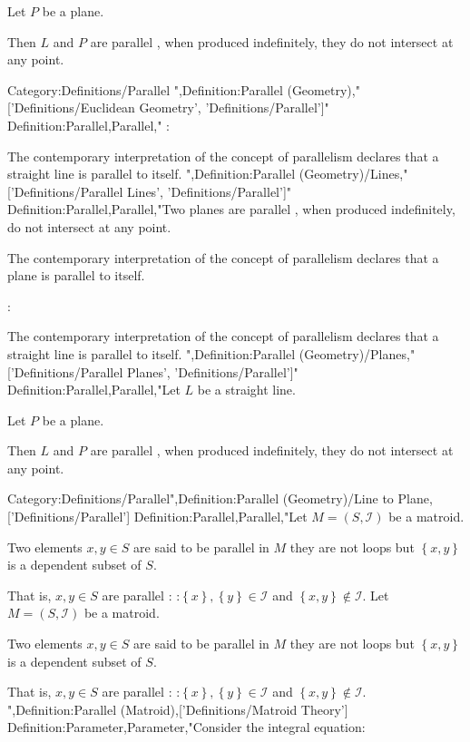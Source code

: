 Let $P$ be a plane.

Then $L$ and $P$ are parallel , when produced indefinitely, they do not intersect at any point.


Category:Definitions/Parallel
",Definition:Parallel (Geometry),"['Definitions/Euclidean Geometry', 'Definitions/Parallel']"
Definition:Parallel,Parallel,"
:


The contemporary interpretation of the concept of parallelism declares that a straight line is parallel to itself.
",Definition:Parallel (Geometry)/Lines,"['Definitions/Parallel Lines', 'Definitions/Parallel']"
Definition:Parallel,Parallel,"Two planes are parallel , when produced indefinitely, do not intersect at any point.





The contemporary interpretation of the concept of parallelism declares that a plane is parallel to itself.

:


The contemporary interpretation of the concept of parallelism declares that a straight line is parallel to itself.
",Definition:Parallel (Geometry)/Planes,"['Definitions/Parallel Planes', 'Definitions/Parallel']"
Definition:Parallel,Parallel,"Let $L$ be a straight line.

Let $P$ be a plane.

Then $L$ and $P$ are parallel , when produced indefinitely, they do not intersect at any point.


Category:Definitions/Parallel",Definition:Parallel (Geometry)/Line to Plane,['Definitions/Parallel']
Definition:Parallel,Parallel,"Let $M = \left( S, \mathscr I \right)$ be a matroid.


Two elements $x, y \in S$ are said to be parallel in $M$  they are not loops but $\left\lbrace x, y \right\rbrace$ is a dependent subset of $S$.


That is, $x, y \in S$ are parallel :
:$\left\lbrace x \right\rbrace, \left\lbrace y \right\rbrace \in \mathscr I$ and $\left\lbrace x, y \right\rbrace \notin \mathscr I$.
Let $M = \left( S, \mathscr I \right)$ be a matroid.


Two elements $x, y \in S$ are said to be parallel in $M$  they are not loops but $\left\lbrace x, y \right\rbrace$ is a dependent subset of $S$.


That is, $x, y \in S$ are parallel :
:$\left\lbrace x \right\rbrace, \left\lbrace y \right\rbrace \in \mathscr I$ and $\left\lbrace x, y \right\rbrace \notin \mathscr I$.
",Definition:Parallel (Matroid),['Definitions/Matroid Theory']
Definition:Parameter,Parameter,"Consider the integral equation:

